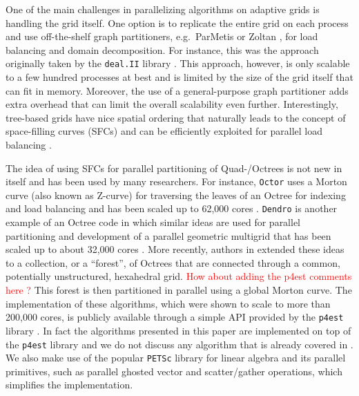 One of the main challenges in parallelizing algorithms on adaptive grids is handling the grid itself. One option is to replicate the entire grid on each process and use off-the-shelf graph partitioners, e.g.\ ParMetis \cite{Karypis;Kumar:98:A-parallel-algorithm} or Zoltan \cite{Boman;Catalyurek;Chevalier;etal:12:The-Zoltan-and-Isorr}, for load balancing and domain decomposition. For instance, this was the approach originally taken by the \texttt{deal.II} library \cite{Bangerth;Hartmann;Kanschat:07:deal.II----a-General}. This approach, however, is only scalable to a few hundred processes at best and is limited by the size of the grid itself that can fit in memory. Moreover, the use of a general-purpose graph partitioner adds extra overhead that can limit the overall scalability even further. Interestingly, tree-based grids have nice spatial ordering that naturally leads to the concept of space-filling curves (SFCs) and can be efficiently exploited for parallel load balancing \cite{Aluru;Sevilgen:97:Parallel-domain-deco,Campbell;Devine;Flaherty;etal:03:Dynamic-octree-load-}.

The idea of using SFCs for parallel partitioning of Quad-/Octrees is not new in itself and has been used by many researchers. For instance, \texttt{Octor} \cite{Tu;OHallaron;Ghattas:05:Scalable-parallel-oc} uses a Morton curve (also known as Z-curve) for traversing the leaves of an Octree for indexing and load balancing and has been scaled up to 62,000 cores \cite{Burstedde;Ghattas;Gurnis;etal:08:Scalable-adaptive-ma}. \texttt{Dendro} \cite{Sampath;Adavani;Sundar;etal:08:Dendro:-parallel-alg} is another example of an Octree code in which similar ideas are used for parallel partitioning and development of a parallel geometric multigrid that has been scaled up to about 32,000 cores \cite{Sampath;Biros:10:A-parallel-geometric}. More recently, authors in \cite{Burstedde;Wilcox;Ghattas:11:p4est:-Scalable-Algo} extended these ideas to a collection, or a ``forest'', of Octrees that are connected through a common, potentially unstructured, hexahedral grid. \textcolor{red}{How about adding the p4est comments here ?} This forest is then partitioned in parallel using a global Morton curve. The implementation of these algorithms, which were shown to scale to more than 200,000 cores, is publicly available through a simple API provided by the \texttt{p4est} library \cite{p4est-github}. In fact the algorithms presented in this paper are implemented on top of the \texttt{p4est} library and we do not discuss any algorithm that is already covered in \cite{Burstedde;Wilcox;Ghattas:11:p4est:-Scalable-Algo}. We also make use of the popular \texttt{PETSc} \cite{Balay;Abhyankar;Adams;etal:14:PETSc-Web-page} library for linear algebra and its parallel primitives, such as parallel ghosted vector and scatter/gather operations, which simplifies the implementation. 

